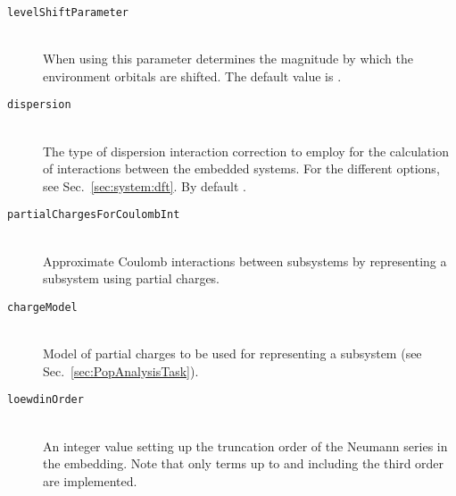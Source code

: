 \begin{description}
  \item [\texttt{levelShiftParameter}]\hfill \\
    When using  this parameter determines the magnitude by which the environment
    orbitals are shifted. The default value is .
  \item [\texttt{dispersion}]\hfill \\
    The type of dispersion interaction correction to employ for the calculation of interactions between the
    embedded systems. For the different options, see Sec.~\ref{sec:system:dft}. By default .
  \item [\texttt{partialChargesForCoulombInt}]\hfill \\
    Approximate Coulomb interactions between subsystems by representing a subsystem using partial charges.
  \item [\texttt{chargeModel}]\hfill \\
    Model of partial charges to be used for representing a subsystem (see Sec.~\ref{sec:PopAnalysisTask}).
  \item [\texttt{loewdinOrder}]\hfill \\
    An integer value setting up the truncation order of the Neumann series in the  embedding. Note that only terms up to and including the third order are implemented.
\end{description}
